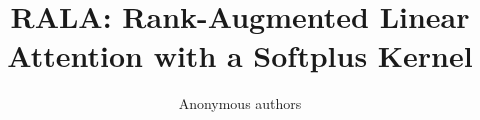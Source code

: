 \title{\textbf{RALA: Rank-Augmented Linear Attention with a Softplus Kernel}}

\author{Anonymous authors}
